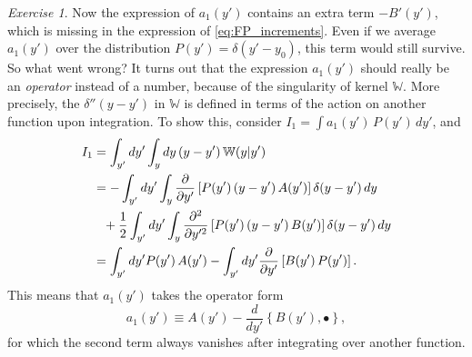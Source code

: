 \documentclass{book}
\numberwithin{equation}{section}
\theoremstyle{plain}
\theoremstyle{definition}
\theoremstyle{remark}
\theoremstyle{BoldStyle}
\newtheorem{exercise}{Exercise}
\numberwithin{exercise}{section}
\begin{document}
\begin{exercise}
{    Now the expression of $a_1(y')$ contains
    an extra term $-B'(y')$,
    which is missing in the expression of \eqref{eq:FP_increments}.
    Even if we average $a_1(y')$ over the distribution
    $P(y') = \delta(y' - y_0)$,
    this term would still survive.
    So what went wrong?
    It turns out that the expression $a_1(y')$ should really be an \emph{operator}
    instead of a number, because of the singularity of kernel $\mathbb W$.
    More precisely, the $\delta''(y - y')$ in $\mathbb W$
    is defined in terms of the action on another function upon integration.
    To show this, consider $I_1 = \int a_1(y') \, P(y') \, dy'$, and
    $$
    \begin{aligned}
    I_1
    &=
    \int_{y'} d y' \int_y dy \, (y - y') \, \mathbb W(y|y')
    \\
    &=
    -
    \int_{y'} dy'
    \int_y
      \frac{\partial }{\partial y' }
      \left[ P(y') \, (y - y') \, A(y') \right]
      \delta(y - y') \, dy
    \\
    &\hphantom{=}
    +
      \frac 1 2
    \int_{y'} dy'
    \int_y
      \frac{ \partial^2 } { \partial y'^2 }
      \left[ P(y') \, (y - y') \, B(y') \right]
      \delta(y - y') \, dy
    \\
    &=
    \int_{y'} dy'
      P(y') \, A(y')
    -
    \int_{y'} dy'
      \frac{ \partial } { \partial y' }
      \left[ B(y') \, P(y') \right].
    \end{aligned}
    $$
    This means that $a_1(y')$ takes the operator form
    $$
    a_1(y') \equiv A(y') - \frac{d}{d y'} \left\{ B(y'), \bullet \right\},
    $$
    for which the second term always vanishes
    after integrating over another function.
  }
\end{exercise}
\end{document}
